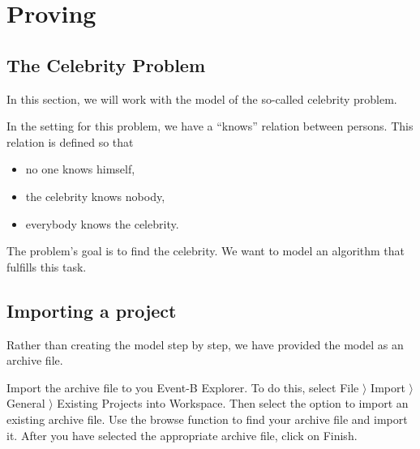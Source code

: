 \section{Proving}
\label{tut_proving}


\subsection{The Celebrity Problem}
\label{tut_celebrity_problem}

In this section, we will work with the model of the so-called celebrity problem.


In the setting for this problem, we have a ``knows'' relation between persons.
This relation is defined so that

\begin{itemize}
	\item no one knows himself,
	\item the celebrity knows nobody,
	\item everybody knows the celebrity.
\end{itemize}    

The problem's goal is to find the celebrity. We want to model an algorithm that fulfills this task.

\subsection{Importing a project}
\label{tut_import_project}

Rather than creating the model step by step, we have provided the model as an archive file.


Import the archive file  to you Event-B Explorer. To do this, select \textsf{File $\rangle $ Import $\rangle $ General $\rangle $ Existing Projects into Workspace}. Then select the option to import an existing archive file. Use the browse function to find your archive file and import it. After you have selected the appropriate archive file, click on \textsf{Finish}.

